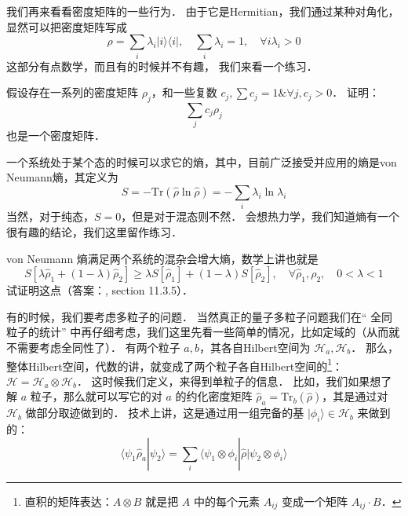 我们再来看看密度矩阵的一些行为． 由于它是Hermitian，我们通过某种对角化，显然可以把密度矩阵写成
\begin{equation}
\rho = \sum_i\lambda_i|i\rangle\langle i|,\quad \sum_i\lambda_i = 1,\quad \forall i\lambda_i > 0 
\end{equation}
这部分有点数学，而且有的时候并不有趣， 我们来看一个练习．

\begin{exer}{}
假设存在一系列的密度矩阵 $\rho_j$，和一些复数 $c_j, \sum c_j = 1 \& \forall j, c_j>0$． 证明：
\begin{equation}
\sum_j c_j \rho_j 
\end{equation}
也是一个密度矩阵．
\end{exer}{}

一个系统处于某个态的时候可以求它的熵，其中，目前广泛接受并应用的熵是von Neumann熵，其定义为
\begin{equation}
S=-\text{Tr}(\hat\rho\ln\hat\rho)=-\sum_i\lambda_i\ln\lambda_i
\end{equation}
当然，对于纯态，$S=0$，但是对于混态则不然． 会想热力学，我们知道熵有一个很有趣的结论，我们这里留作练习．

\begin{exer}{}
von Neumann 熵满足两个系统的混杂会增大熵，数学上讲也就是
\begin{equation}
S[\lambda\hat\rho_1+(1-\lambda)\hat\rho_2]\ge\lambda S[\hat\rho_1]+(1-\lambda) S[\hat\rho_2],\quad \forall \hat\rho_1,\rho_2,\quad 0<\lambda<1
\end{equation}
试证明这点（答案：\cite{nielsen2010quantum}, section 11.3.5）．
\end{exer}{}

有的时候，我们要考虑多粒子的问题． 当然真正的量子多粒子问题我们在“ 全同粒子的统计” 中再仔细考虑，我们这里先看一些简单的情况，比如定域的（从而就不需要考虑全同性了）． 有两个粒子 $a, b$，其各自Hilbert空间为 $\mathcal{H}_a, \mathcal{H}_b$． 那么，整体Hilbert空间，代数的讲，就变成了两个粒子各自Hilbert空间的\footnote{直积的矩阵表达：$A\otimes B$ 就是把 $A$ 中的每个元素 $A_{ij}$ 变成一个矩阵 $A_{ij}\cdot B$．}：$\mathcal{H} = \mathcal{H}_a\otimes \mathcal{H}_b$． 这时候我们定义，来得到单粒子的信息． 比如，我们如果想了解 $a$ 粒子，那么就可以写它的对 $a$ 的约化密度矩阵 $\hat\rho_a=\text{Tr}_b(\hat\rho)$，其是通过对 $\mathcal{H}_b$ 做部分取迹做到的． 技术上讲，这是通过用一组完备的基 $|\phi_i\rangle \in\mathcal{H}_b$ 来做到的：
\begin{equation}
\langle\psi_1\hat\rho_a|\psi_2\rangle=\sum_i\langle\psi_1\otimes\phi_i|\hat\rho|\psi_2\otimes\phi_i\rangle
\end{equation}

